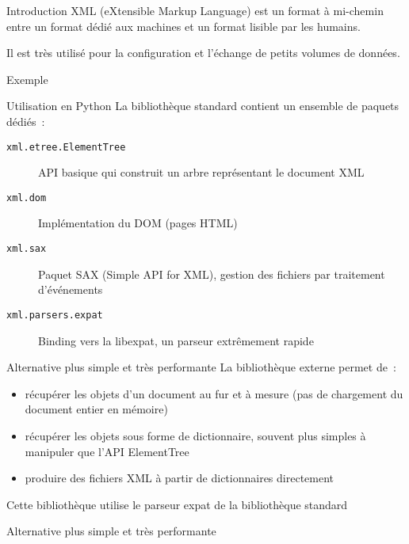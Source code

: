 \begin{frame}{Introduction}
  XML (eXtensible Markup Language) est un format à mi-chemin entre un format dédié aux machines et un format lisible par les humains.

  Il est très utilisé pour la configuration et l'échange de petits volumes de données.
\end{frame}

\begin{frame}{Exemple}
\end{frame}

\begin{frame}{Utilisation en Python}
  La bibliothèque standard contient un ensemble de paquets dédiés~:

  \begin{description}
    \item[\texttt{xml.etree.ElementTree}] API basique qui construit un arbre représentant le document XML
    \item[\texttt{xml.dom}] Implémentation du DOM (pages HTML)
    \item[\texttt{xml.sax}] Paquet SAX (Simple API for XML), gestion des fichiers par traitement d'événements
    \item[\texttt{xml.parsers.expat}] Binding vers la libexpat, un parseur extrêmement rapide
  \end{description}
\end{frame}

\begin{frame}{Alternative plus simple et très performante}
  La bibliothèque externe  permet de~:

  \begin{itemize}
    \item récupérer les objets d'un document au fur et à mesure (pas de chargement du document entier en mémoire)
    \item récupérer les objets sous forme de dictionnaire, souvent plus simples à manipuler que l'API ElementTree
    \item produire des fichiers XML à partir de dictionnaires directement
  \end{itemize}

  Cette bibliothèque utilise le parseur expat de la bibliothèque standard
\end{frame}

\begin{frame}{Alternative plus simple et très performante}
\end{frame}
